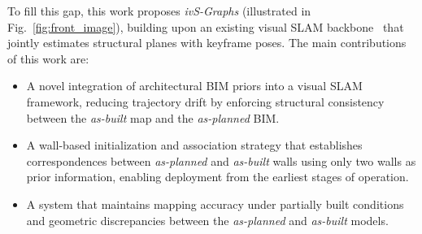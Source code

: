 To fill this gap, this work proposes \textit{ivS-Graphs} (illustrated in Fig.~\ref{fig:front_image}), building upon an existing visual SLAM backbone~\cite{tourani2025vsgraphs} that jointly estimates structural planes with keyframe poses. 
{}
The main contributions of this work are:

\begin{itemize}
    \item A novel integration of architectural BIM priors into a visual SLAM framework, reducing trajectory drift by enforcing structural consistency between the \textit{as-built} map and the \textit{as-planned} BIM.
    \item A wall-based initialization and association strategy that establishes correspondences between \textit{as-planned} and \textit{as-built} walls using only two walls as prior information, enabling deployment from the earliest stages of operation.
    \item A system that maintains mapping accuracy under partially built conditions and geometric discrepancies between the \textit{as-planned} and \textit{as-built} models.
\end{itemize}


